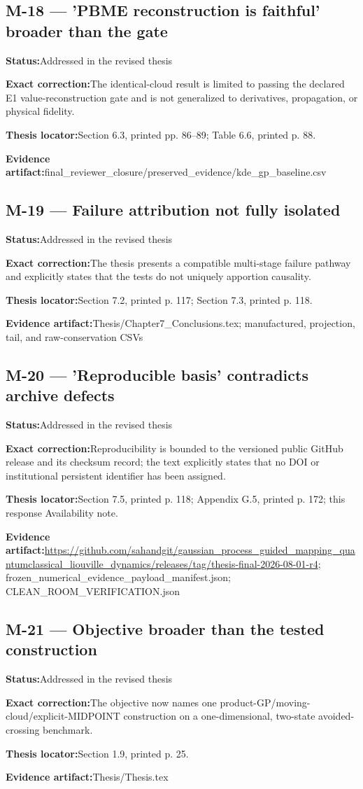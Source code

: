 \documentclass[11pt]{article}
\newcommand{\field}[2]{\textbf{#1}\quad #2\par}
\begin{document}
\subsection*{M-18 --- 'PBME reconstruction is faithful' broader than the gate}
\field{Status:}{Addressed in the revised thesis}
\field{Exact correction:}{The identical-cloud result is limited to passing the declared E1 value-reconstruction gate and is not generalized to derivatives, propagation, or physical fidelity.}
\field{Thesis locator:}{Section 6.3, printed pp. 86--89; Table 6.6, printed p. 88.}
\field{Evidence artifact:}{final\_reviewer\_closure/preserved\_evidence/kde\_gp\_baseline.csv}
\subsection*{M-19 --- Failure attribution not fully isolated}
\field{Status:}{Addressed in the revised thesis}
\field{Exact correction:}{The thesis presents a compatible multi-stage failure pathway and explicitly states that the tests do not uniquely apportion causality.}
\field{Thesis locator:}{Section 7.2, printed p. 117; Section 7.3, printed p. 118.}
\field{Evidence artifact:}{Thesis/Chapter7\_Conclusions.tex; manufactured, projection, tail, and raw-conservation CSVs}
\subsection*{M-20 --- 'Reproducible basis' contradicts archive defects}
\field{Status:}{Addressed in the revised thesis}
\field{Exact correction:}{Reproducibility is bounded to the versioned public GitHub release and its checksum record; the text explicitly states that no DOI or institutional persistent identifier has been assigned.}
\field{Thesis locator:}{Section 7.5, printed p. 118; Appendix G.5, printed p. 172; this response Availability note.}
\field{Evidence artifact:}{\url{https://github.com/sahandgit/gaussian_process_guided_mapping_quantumclassical_liouville_dynamics/releases/tag/thesis-final-2026-08-01-r4}; frozen\_numerical\_evidence\_payload\_manifest.json; CLEAN\_ROOM\_VERIFICATION.json}
\subsection*{M-21 --- Objective broader than the tested construction}
\field{Status:}{Addressed in the revised thesis}
\field{Exact correction:}{The objective now names one product-GP/moving-cloud/explicit-MIDPOINT construction on a one-dimensional, two-state avoided-crossing benchmark.}
\field{Thesis locator:}{Section 1.9, printed p. 25.}
\field{Evidence artifact:}{Thesis/Thesis.tex}
\end{document}
